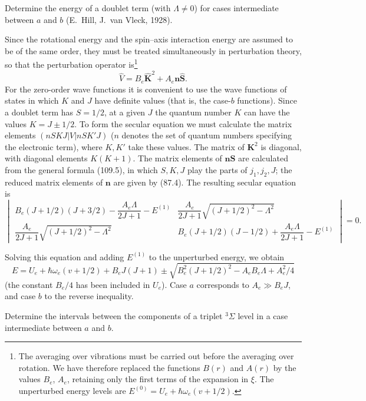 \ProblemHeading[2] Determine the energy of a doublet term (with $\Lambda\ne0$) for cases intermediate between $a$ and $b$ (E.~Hill, J.~van Vleck, 1928).

\SolutionHeading Since the rotational energy and the spin--axis interaction energy are assumed to be of the same order, they must be treated simultaneously in perturbation theory, so that the perturbation operator is\footnote{The averaging over vibrations must be carried out before the averaging over rotation. We have therefore replaced the functions $B(r)$ and $A(r)$ by the values $B_e$, $A_e$, retaining only the first terms of the expansion in $\xi$. The unperturbed energy levels are $E^{(0)}=U_e+\hbar\omega_e(v+1/2)$.}
\[
 \widehat V=B_e\widehat{\mathbf K}^{2}+A_e\mathbf n\widehat{\mathbf S}.
\]
For the zero-order wave functions it is convenient to use the wave functions of states in which $K$ and $J$ have definite values (that is, the case-$b$ functions). Since a doublet term has $S=1/2$, at a given $J$ the quantum number $K$ can have the values $K=J\pm1/2$. To form the secular equation we must calculate the matrix elements $(nSKJ|V|nSK'J)$ ($n$ denotes the set of quantum numbers specifying the electronic term), where $K,K'$ take these values. The matrix of $\mathbf K^2$ is diagonal, with diagonal elements $K(K+1)$. The matrix elements of $\mathbf n\mathbf S$ are calculated from the general formula (109.5), in which $S,K,J$ play the parts of $j_1,j_2,J$; the reduced matrix elements of $\mathbf n$ are given by (87.4). The resulting secular equation is
\[
\begin{vmatrix}
B_e(J+1/2)(J+3/2)-\dfrac{A_e\Lambda}{2J+1}-E^{(1)} & \dfrac{A_e}{2J+1}\sqrt{(J+1/2)^2-\Lambda^2}\\[6pt]
\dfrac{A_e}{2J+1}\sqrt{(J+1/2)^2-\Lambda^2} & B_e(J+1/2)(J-1/2)+\dfrac{A_e\Lambda}{2J+1}-E^{(1)}
\end{vmatrix}=0.
\]

Solving this equation and adding $E^{(1)}$ to the unperturbed energy, we obtain
\[
 E=U_e+\hbar\omega_e(v+1/2)+B_eJ(J+1)
 \pm\sqrt{B_e^2(J+1/2)^2-A_eB_e\Lambda+A_e^2/4}
\]
(the constant $B_e/4$ has been included in $U_e$). Case $a$ corresponds to $A_e\gg B_eJ$, and case $b$ to the reverse inequality.

\ProblemHeading[3] Determine the intervals between the components of a triplet ${}^3\Sigma$ level in a case intermediate between $a$ and $b$.

